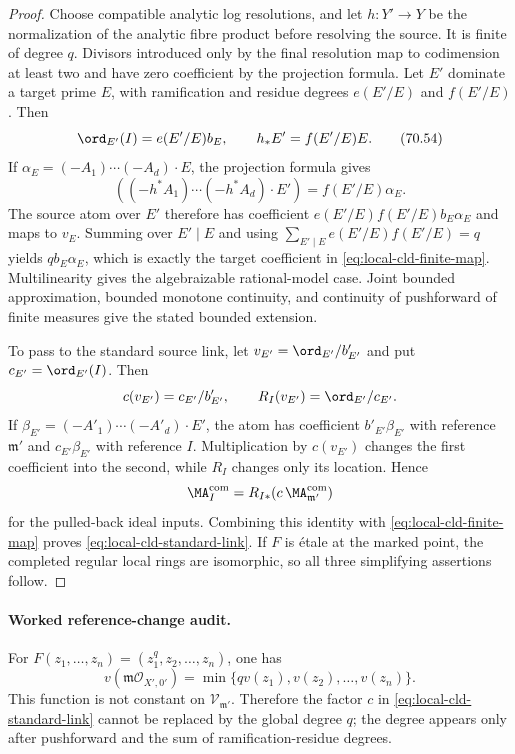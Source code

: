 \begin{proof}
Choose compatible analytic log resolutions, and let \(h:Y'\to Y\) be the
normalization of the analytic fibre product before resolving the source.
It is finite of degree \(q\). Divisors introduced only by the final
resolution map to codimension at least two and have zero coefficient by the
projection formula. Let \(E'\) dominate a target prime \(E\), with
ramification and residue degrees \(e(E'/E)\) and \(f(E'/E)\). Then
\[
 \ord_{E'}(I)=e(E'/E)b_E,
 \qquad
 h_*E'=f(E'/E)E.
\tag{70.54}\label{eq:local-cld-ef}
\]
If \(\alpha_E=(-A_1)\cdots(-A_d)\cdot E\), the projection formula gives
\[
 ((-h^*A_1)\cdots(-h^*A_d)\cdot E')=f(E'/E)\alpha_E.
\]
The source atom over \(E'\) therefore has coefficient
\(e(E'/E)f(E'/E)b_E\alpha_E\) and maps to \(v_E\). Summing over
\(E'\mid E\) and using
\(\sum_{E'\mid E}e(E'/E)f(E'/E)=q\) yields
\(qb_E\alpha_E\), which is exactly the target coefficient in
\eqref{eq:local-cld-finite-map}. Multilinearity gives the algebraizable
rational-model case. Joint bounded approximation, bounded monotone
continuity, and continuity of pushforward of finite measures give the
stated bounded extension.

To pass to the standard source link, let
\(v_{E'}=\ord_{E'}/b'_{E'}\) and put
\(c_{E'}=\ord_{E'}(I)\). Then
\[
 c(v_{E'})=c_{E'}/b'_{E'},
 \qquad
 R_I(v_{E'})=\ord_{E'}/c_{E'}.
\]
If \(\beta_{E'}=(-A'_1)\cdots(-A'_d)\cdot E'\), the atom has coefficient
\(b'_{E'}\beta_{E'}\) with reference \(\mathfrak m'\) and
\(c_{E'}\beta_{E'}\) with reference \(I\). Multiplication by
\(c(v_{E'})\) changes the first coefficient into the second, while \(R_I\)
changes only its location. Hence
\[
 \MA_I^{\mathrm{com}}
 =R_{I*}\!\left(c\,\MA_{\mathfrak m'}^{\mathrm{com}}\right)
\]
for the pulled-back ideal inputs. Combining this identity with
\eqref{eq:local-cld-finite-map} proves
\eqref{eq:local-cld-standard-link}. If \(F\) is \'etale
at the marked point, the completed regular local rings are isomorphic, so
all three simplifying assertions follow.
\end{proof}

\paragraph{Worked reference-change audit.}
For
\(F(z_1,\ldots,z_n)=(z_1^q,z_2,\ldots,z_n)\), one has
\[
 v(\mathfrak m\mathcal O_{X',0'})
 =\min\{qv(z_1),v(z_2),\ldots,v(z_n)\}.
\]
This function is not constant on \(\mathcal V_{\mathfrak m'}\). Therefore
the factor \(c\) in \eqref{eq:local-cld-standard-link} cannot be replaced by
the global degree \(q\); the degree appears only after pushforward and the
sum of ramification-residue degrees.

